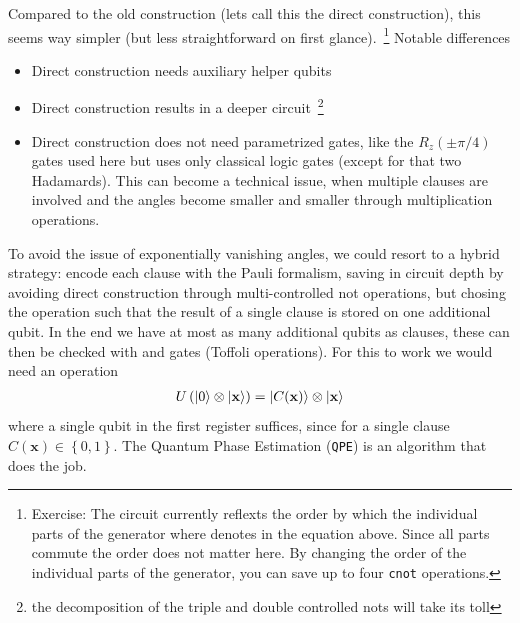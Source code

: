 Compared to the old construction (lets call this the direct construction), this seems way simpler (but less straightforward on first glance).~\footnote{Exercise: The circuit currently reflexts the order by which the individual parts of the generator where denotes in the equation above. Since all parts commute the order does not matter here. By changing the order of the individual parts of the generator, you can save up to four \texttt{cnot} operations.} Notable differences
\begin{itemize}
    \item Direct construction needs auxiliary helper qubits
    \item Direct construction results in a deeper circuit~\footnote{the decomposition of the triple and double controlled nots will take its toll}
    \item Direct construction does not need parametrized gates, like the $R_z(\pm \pi/4)$ gates used here but uses only classical logic gates (except for that two Hadamards). This can become a technical issue, when multiple clauses are involved and the angles become smaller and smaller through multiplication operations. 
\end{itemize}

To avoid the issue of exponentially vanishing angles, we could resort to a hybrid strategy: encode each clause with the Pauli formalism, saving in circuit depth by avoiding direct construction through multi-controlled not operations, but chosing the operation such that the result of a single clause is stored on one additional qubit. In the end we have at most as many additional qubits as clauses, these can then be checked with and gates (Toffoli operations). 
For this to work we would need an operation
\begin{align}
    U\left(\ket{0}\otimes\ket{\mathbf{x}}\right) =  \ket{C(\mathbf{x})}\otimes\ket{\mathbf{x}}
\end{align}
where a single qubit in the first register suffices, since for a single clause $C(\mathbf{x})\in \left\{0,1\right\}$.
The Quantum Phase Estimation (\texttt{QPE}) is an algorithm that does the job.


